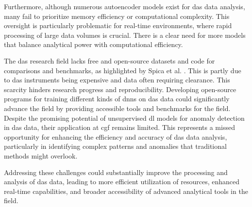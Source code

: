 Furthermore, although numerous autoencoder models exist for \acrshort{das} data analysis, many fail to prioritize memory efficiency or computational complexity. This oversight is particularly problematic for real-time environments, where rapid processing of large data volumes is crucial. There is a clear need for more models that balance analytical power with computational efficiency. 

The \acrshort{das} research field lacks free and open-source datasets and code for comparisons and benchmarks, as highlighted by Spica et al. \cite{spica2022pubdas}. This is partly due to \acrshort{das} instruments being expensive and data often requiring clearance. This scarcity hinders research progress and reproducibility. Developing open-source programs for training different kinds of \acrshort{dnn}s on \acrshort{das} data could significantly advance the field by providing accessible tools and benchmarks for the field. Despite the promising potential of unsupervised \acrshort{dl} models for anomaly detection in \acrshort{das} data, their application at \acrshort{cgf} remains limited. This represents a missed opportunity for enhancing the efficiency and accuracy of \acrshort{das} data analysis, particularly in identifying complex patterns and anomalies that traditional methods might overlook.

Addressing these challenges could substantially improve the processing and analysis of \acrshort{das} data, leading to more efficient utilization of resources, enhanced real-time capabilities, and broader accessibility of advanced analytical tools in the field. 

